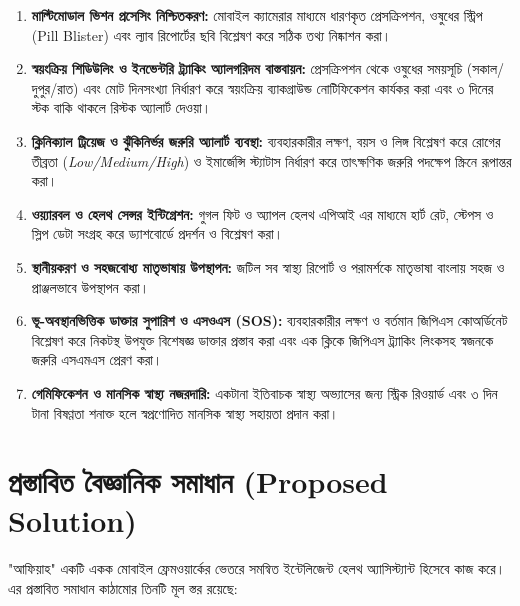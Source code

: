 \documentclass[12pt,a4paper,oneside]{report}
\begin{document}
\begin{enumerate}
    \item \textbf{মাল্টিমোডাল ভিশন প্রসেসিং নিশ্চিতকরণ:} মোবাইল ক্যামেরার মাধ্যমে ধারণকৃত প্রেসক্রিপশন, ওষুধের স্ট্রিপ (Pill Blister) এবং ল্যাব রিপোর্টের ছবি বিশ্লেষণ করে সঠিক তথ্য নিষ্কাশন করা।
    \item \textbf{স্বয়ংক্রিয় শিডিউলিং ও ইনভেন্টরি ট্র্যাকিং অ্যালগরিদম বাস্তবায়ন:} প্রেসক্রিপশন থেকে ওষুধের সময়সূচি (সকাল/দুপুর/রাত) এবং মোট দিনসংখ্যা নির্ধারণ করে স্বয়ংক্রিয় ব্যাকগ্রাউন্ড নোটিফিকেশন কার্যকর করা এবং ৩ দিনের স্টক বাকি থাকলে রিস্টক অ্যালার্ট দেওয়া।
    \item \textbf{ক্লিনিক্যাল ট্রিয়েজ ও ঝুঁকিনির্ভর জরুরি অ্যালার্ট ব্যবস্থা:} ব্যবহারকারীর লক্ষণ, বয়স ও লিঙ্গ বিশ্লেষণ করে রোগের তীব্রতা (\textit{Low/Medium/High}) ও ইমার্জেন্সি স্ট্যাটাস নির্ধারণ করে তাৎক্ষণিক জরুরি পদক্ষেপ স্ক্রিনে রূপান্তর করা।
    \item \textbf{ওয়্যারবল ও হেলথ সেন্সর ইন্টিগ্রেশন:} গুগল ফিট ও অ্যাপল হেলথ এপিআই এর মাধ্যমে হার্ট রেট, স্টেপস ও স্লিপ ডেটা সংগ্রহ করে ড্যাশবোর্ডে প্রদর্শন ও বিশ্লেষণ করা।
    \item \textbf{স্থানীয়করণ ও সহজবোধ্য মাতৃভাষায় উপস্থাপন:} জটিল সব স্বাস্থ্য রিপোর্ট ও পরামর্শকে মাতৃভাষা বাংলায় সহজ ও প্রাঞ্জলভাবে উপস্থাপন করা।
    \item \textbf{ভূ-অবস্থানভিত্তিক ডাক্তার সুপারিশ ও এসওএস (SOS):} ব্যবহারকারীর লক্ষণ ও বর্তমান জিপিএস কোঅর্ডিনেট বিশ্লেষণ করে নিকটস্থ উপযুক্ত বিশেষজ্ঞ ডাক্তার প্রস্তাব করা এবং এক ক্লিকে জিপিএস ট্র্যাকিং লিংকসহ স্বজনকে জরুরি এসএমএস প্রেরণ করা।
    \item \textbf{গেমিফিকেশন ও মানসিক স্বাস্থ্য নজরদারি:} একটানা ইতিবাচক স্বাস্থ্য অভ্যাসের জন্য স্ট্রিক রিওয়ার্ড এবং ৩ দিন টানা বিষণ্ণতা শনাক্ত হলে স্বপ্রণোদিত মানসিক স্বাস্থ্য সহায়তা প্রদান করা।
\end{enumerate}

\chapter{প্রস্তাবিত বৈজ্ঞানিক সমাধান (Proposed Solution)}

"আফিয়াহ" একটি একক মোবাইল ফ্রেমওয়ার্কের ভেতরে সমন্বিত ইন্টেলিজেন্ট হেলথ অ্যাসিস্ট্যান্ট হিসেবে কাজ করে। এর প্রস্তাবিত সমাধান কাঠামোর তিনটি মূল স্তর রয়েছে:
\end{document}
